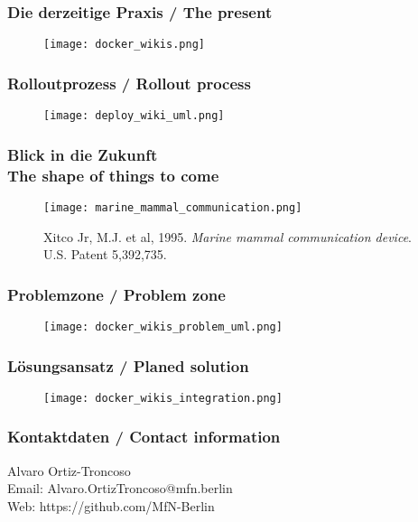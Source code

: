 \documentclass[13pt]{beamer}
\begin{document}
\begin{frame}
  \frametitle{Die derzeitige Praxis / \textcolor{mfn_green}{The present}}
  \begin{figure}
    \texttt{[image: docker\_wikis.png]}
  \end{figure}
\end{frame}

\begin{frame}
  \frametitle{Rolloutprozess / \textcolor{mfn_green}{Rollout process}}

  \begin{figure}
    \texttt{[image: deploy\_wiki\_uml.png]}
  \end{figure}

\end{frame}

%
%

\begin{frame}
  \frametitle{Blick in die Zukunft \\ \textcolor{mfn_green}{The shape of things to come}}
  \begin{figure}
    \texttt{[image: marine\_mammal\_communication.png]}
    \caption{Xitco Jr, M.J. et al, 1995. \textit{Marine mammal communication device}. U.S. Patent 5,392,735.}
  \end{figure}
\end{frame}

\begin{frame}
  \frametitle{Problemzone / \textcolor{mfn_green}{Problem zone}}
  \begin{figure}
    \texttt{[image: docker\_wikis\_problem\_uml.png]}
  \end{figure}
\end{frame}

\begin{frame}
  \frametitle{Lösungsansatz / \textcolor{mfn_green}{Planed solution}}
  \begin{figure}
    \texttt{[image: docker\_wikis\_integration.png]}
  \end{figure}
\end{frame}

\begin{frame}
  \frametitle{Kontaktdaten / \textcolor{mfn_green}{Contact information}}
  \begin{center}
    Alvaro Ortiz-Troncoso \\
    \medskip
    Email: Alvaro.OrtizTroncoso@mfn.berlin \\    
    \medskip
    Web: https://github.com/MfN-Berlin
  \end{center}
\end{frame}
\end{document}
